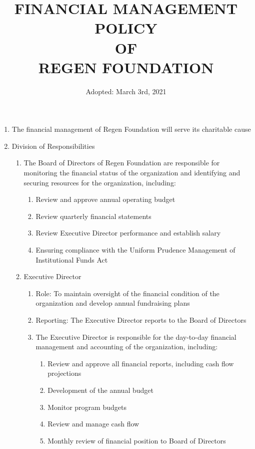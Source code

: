 \documentclass{article}
\begin{document}
\title{FINANCIAL MANAGEMENT POLICY \protect\\ OF \protect\\ REGEN FOUNDATION}
\author{Adopted: March 3rd, 2021}
\date{} 
\maketitle
\begin{enumerate}
\item The financial management of Regen Foundation will serve its charitable cause
\item Division of Responsibilities
\begin{enumerate}
\item The Board of Directors of Regen Foundation are responsible for monitoring the financial status of the organization and identifying and securing resources for the organization, including:
\begin{enumerate}
\item Review and approve annual operating budget
\item Review quarterly financial statements
\item Review Executive Director performance and establish salary
\item Ensuring compliance with the Uniform Prudence Management of Institutional Funds Act
\end{enumerate}
\item Executive Director
\begin{enumerate}
\item Role: To maintain oversight of the financial condition of the organization and develop annual fundraising plans
\item Reporting: The Executive Director reports to the Board of Directors
\item The Executive Director is responsible for the day-to-day financial management and accounting of the organization, including:
\begin{enumerate}
\item Review and approve all financial reports, including cash flow projections
\item Development of the annual budget
\item Monitor program budgets
\item Review and manage cash flow
\item Monthly review of financial position to Board of Directors
\end{enumerate}
\end{enumerate}

\end{enumerate}
\end{enumerate}
\end{document}
